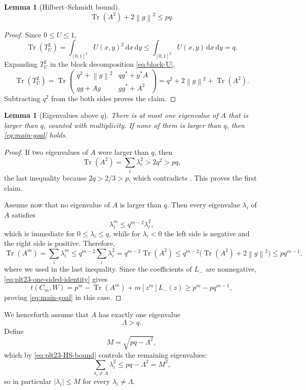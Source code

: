 ﻿\documentclass[11pt]{article}
\newtheorem{lemma}[theorem]{Lemma}
\numberwithin{equation}{section}
\newcommand{\norm}[1]{\left\lVert #1\right\rVert}
\newcommand{\Tr}{\operatorname{Tr}}
\newcommand{\dd}{\,\mathrm d}
\begin{document}
\begin{lemma}[Hilbert--Schmidt bound]\label{lem:plt23-HS-bound}
  \begin{equation}\label{eq:plt23-HS-bound}
    \Tr(A^2)+2\norm g^2\le pq.
  \end{equation}
\end{lemma}

\begin{proof}
  Since $0\le U\le1$,
  \[
    \Tr(T_U^2)=\int_{[0,1]^2}U(x,y)^2\dd x\dd y
    \le\int_{[0,1]^2}U(x,y)\dd x\dd y=q.
  \]
  Expanding $T_U^2$ in the block decomposition \eqref{eq:block-U},
  \[
    \Tr(T_U^2)=\Tr\begin{pmatrix}q^2 + \norm g^2 & q g^* + g^* A \\ qg + Ag & g g^* + A^2\end{pmatrix}=q^2+2\norm g^2+\Tr(A^2).
  \]
  Subtracting $q^2$ from the both sides proves the claim.
\end{proof}

\begin{lemma}[Eigenvalues above $q$]\label{lem:plt23-eigenvalues-above-q}
  There is at most one eigenvalue of $A$ that is larger than $q$, counted with multiplicity.
  If none of them is larger than $q$, then \eqref{eq:main-goal} holds.
\end{lemma}

\begin{proof}
  If two eigenvalues of $A$ were larger than $q$, then
  \[
    \Tr(A^2)=\sum_i\lambda_i^2>2q^2>pq,
  \]
  the last inequality because $2q>2/3>p$, which contradicts .
  This proves the first claim.

  Assume now that no eigenvalue of $A$ is larger than $q$.
  Then every eigenvalue $\lambda_i$ of $A$ satisfies
  \[
    \lambda_i^m\le q^{m-2}\lambda_i^2,
  \]
  which is immediate for $0\le\lambda_i\le q$, while for $\lambda_i<0$ the left side is negative and the right side is positive.
  Therefore,
  \[
    \Tr(A^m) = \sum_{i}\lambda_i^m\le q^{m-2} \sum_{i} \lambda_i^2 = q^{m-2} \Tr(A^2) \le q^{m-2} \bigl(\Tr(A^2) + 2\norm g^2\bigr) \le pq^{m-1},
  \]
  where we used  in the last inequality.
  Since the coefficients of $L_-$ are nonnegative, \eqref{eq:plt23-one-sided-identity} gives
  \[
    t(C_m,W) = p^m - \Tr(A^m) + m[z^m]L_-(z) \ge p^m - pq^{m-1},
  \]
  proving \eqref{eq:main-goal} in this case.
\end{proof}

We henceforth assume that $A$ has exactly one eigenvalue
\begin{equation}\label{eq:plt23-Lambda-above-q}
  \Lambda>q.
\end{equation}
Define
\begin{equation}\label{eq:plt23-M-def}
  M=\sqrt{pq-\Lambda^2},
\end{equation}
which by \eqref{eq:plt23-HS-bound} controls the remaining eigenvalues:
\[
  \sum_{\lambda_i\ne\Lambda}\lambda_i^2\le pq-\Lambda^2=M^2,
\]
so in particular $|\lambda_i|\le M$ for every $\lambda_i\ne\Lambda$.
\end{document}

